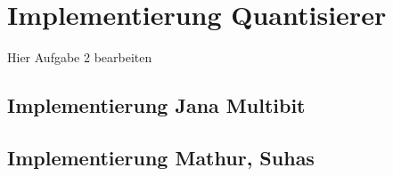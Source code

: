 \section{Implementierung Quantisierer}

Hier Aufgabe 2 bearbeiten
\subsection{Implementierung Jana Multibit}

\subsection{Implementierung Mathur, Suhas}